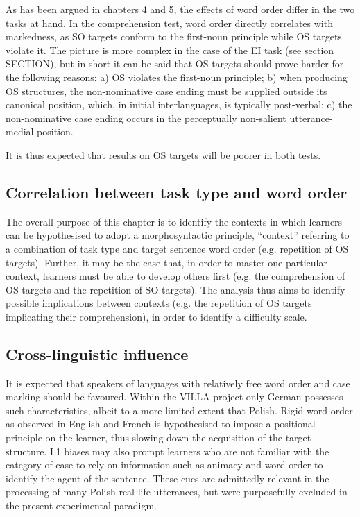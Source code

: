 As has been argued in chapters 4 and 5, the effects of word order differ in the two tasks at hand. In the comprehension test, word order directly correlates with markedness, as SO targets conform to the first-noun principle while OS targets violate it. The picture is more complex in the case of the EI task (see section SECTION), but in short it can be said that OS targets should prove harder for the following reasons: a) OS violates the first-noun principle; b) when producing OS structures, the non-nominative case ending must be supplied outside its canonical position, which, in initial interlanguages, is typically post-verbal; c) the non-nominative case ending occurs in the perceptually non-salient utterance-medial position. 

It is thus expected that results on OS targets will be poorer in both tests.

\subsection{Correlation between task type and word order}\label{sec:06:1.3}

The overall purpose of this chapter is to identify the contexts in which learners can be hypothesised to adopt a morphosyntactic principle, “context” referring to a combination of task type and target sentence word order (e.g. repetition of OS targets). Further, it may be the case that, in order to master one particular context, learners must be able to develop others first (e.g. the comprehension of OS targets and the repetition of SO targets). The analysis thus aims to identify possible implications between contexts (e.g. the repetition of OS targets implicating their comprehension), in order to identify a difficulty scale. 

\subsection{Cross-linguistic influence}\label{sec:06:1.4}

It is expected that speakers of languages with relatively free word order and case marking should be favoured. Within the VILLA project only German possesses such characteristics, albeit to a more limited extent that Polish. Rigid word order as observed in English and French is hypothesised to impose a positional principle on the learner, thus slowing down the acquisition of the target structure. L1 biases may also prompt learners who are not familiar with the category of case to rely on information such as animacy and word order to identify the agent of the sentence. These cues are admittedly relevant in the processing of many Polish real-life utterances, but were purposefully excluded in the present experimental paradigm.

